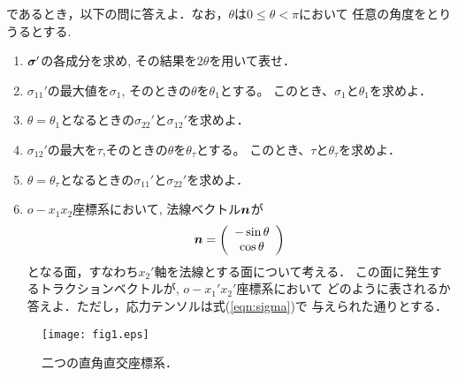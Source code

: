 \documentclass[10pt,a4j]{jarticle}
\begin{document}
であるとき，以下の問に答えよ．なお，$\theta$は$0 \leq \theta < \pi$において
任意の角度をとりうるとする.
\begin{enumerate}
\item
	$\mbox{\boldmath $\sigma$}'$の各成分を求め, その結果を$2\theta$を用いて表せ．
\item
	$\sigma_{11}'$の最大値を$\sigma_1$, そのときの$\theta$を$\theta_1$とする。
	このとき、$\sigma_1$と$\theta_1$を求めよ．
\item
	$\theta=\theta_1$となるときの$\sigma_{22}'$と$\sigma_{12}'$を求めよ．
\item
	$\sigma_{12}'$の最大を$\tau$,そのときの$\theta$を$\theta_\tau$とする。
	このとき、$\tau$と$\theta_\tau$を求めよ．
\item
	$\theta=\theta_\tau$となるときの$\sigma_{11}'$と$\sigma_{22}'$を求めよ．
\item
	$o-x_1x_2$座標系において, 法線ベクトル$\mbox{\boldmath $n$}$が
	\[
		\mbox{\boldmath $n$}=\left( 
		\begin{array}{c}
			-\sin \theta \\
			\cos \theta
		\end{array}
		\right)
	\]
	となる面，すなわち$x_2'$軸を法線とする面について考える．
	この面に発生するトラクションベクトルが, $o-x_1'x_2'$座標系において
	どのように表されるか答えよ．ただし，応力テンソルは式(\ref{eqn:sigma})で
	与えられた通りとする．
\end{enumerate}
\begin{figure}[h]
	\begin{center}
	\texttt{[image: fig1.eps]} 
	\end{center}
	\vspace{-5mm}
	\caption{二つの直角直交座標系．} 
	\label{fig:fig1}
\end{figure}
\end{document}
